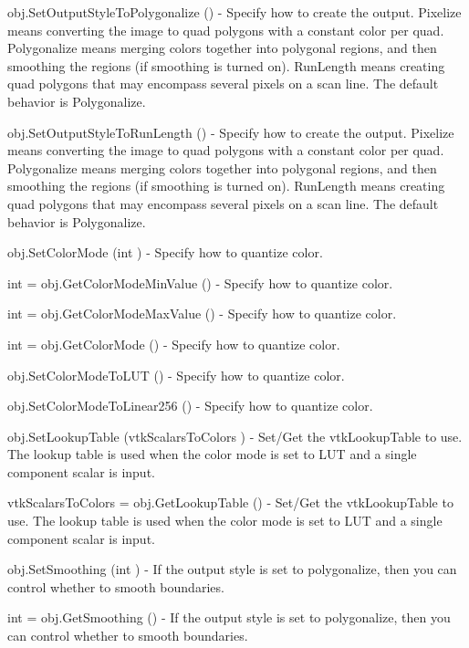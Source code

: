 \begin{DoxyItemize}
\item {\ttfamily obj.\-Set\-Output\-Style\-To\-Polygonalize ()} -\/ Specify how to create the output. Pixelize means converting the image to quad polygons with a constant color per quad. Polygonalize means merging colors together into polygonal regions, and then smoothing the regions (if smoothing is turned on). Run\-Length means creating quad polygons that may encompass several pixels on a scan line. The default behavior is Polygonalize.  
\item {\ttfamily obj.\-Set\-Output\-Style\-To\-Run\-Length ()} -\/ Specify how to create the output. Pixelize means converting the image to quad polygons with a constant color per quad. Polygonalize means merging colors together into polygonal regions, and then smoothing the regions (if smoothing is turned on). Run\-Length means creating quad polygons that may encompass several pixels on a scan line. The default behavior is Polygonalize.  
\item {\ttfamily obj.\-Set\-Color\-Mode (int )} -\/ Specify how to quantize color.  
\item {\ttfamily int = obj.\-Get\-Color\-Mode\-Min\-Value ()} -\/ Specify how to quantize color.  
\item {\ttfamily int = obj.\-Get\-Color\-Mode\-Max\-Value ()} -\/ Specify how to quantize color.  
\item {\ttfamily int = obj.\-Get\-Color\-Mode ()} -\/ Specify how to quantize color.  
\item {\ttfamily obj.\-Set\-Color\-Mode\-To\-L\-U\-T ()} -\/ Specify how to quantize color.  
\item {\ttfamily obj.\-Set\-Color\-Mode\-To\-Linear256 ()} -\/ Specify how to quantize color.  
\item {\ttfamily obj.\-Set\-Lookup\-Table (vtk\-Scalars\-To\-Colors )} -\/ Set/\-Get the vtk\-Lookup\-Table to use. The lookup table is used when the color mode is set to L\-U\-T and a single component scalar is input.  
\item {\ttfamily vtk\-Scalars\-To\-Colors = obj.\-Get\-Lookup\-Table ()} -\/ Set/\-Get the vtk\-Lookup\-Table to use. The lookup table is used when the color mode is set to L\-U\-T and a single component scalar is input.  
\item {\ttfamily obj.\-Set\-Smoothing (int )} -\/ If the output style is set to polygonalize, then you can control whether to smooth boundaries.  
\item {\ttfamily int = obj.\-Get\-Smoothing ()} -\/ If the output style is set to polygonalize, then you can control whether to smooth boundaries.  

\end{DoxyItemize}
